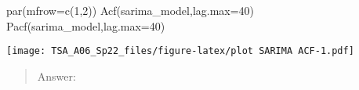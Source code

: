 \documentclass[
]{article}
\newenvironment{Shaded}{\begin{snugshade}}{\end{snugshade}}
\newcommand{\AttributeTok}[1]{\textcolor[rgb]{0.77,0.63,0.00}{#1}}
\newcommand{\DecValTok}[1]{\textcolor[rgb]{0.00,0.00,0.81}{#1}}
\newcommand{\FunctionTok}[1]{\textcolor[rgb]{0.00,0.00,0.00}{#1}}
\newcommand{\NormalTok}[1]{#1}
\begin{document}
\begin{Shaded}
\begin{Highlighting}[]
\FunctionTok{par}\NormalTok{(}\AttributeTok{mfrow=}\FunctionTok{c}\NormalTok{(}\DecValTok{1}\NormalTok{,}\DecValTok{2}\NormalTok{))}
\FunctionTok{Acf}\NormalTok{(sarima\_model,}\AttributeTok{lag.max=}\DecValTok{40}\NormalTok{)}
\FunctionTok{Pacf}\NormalTok{(sarima\_model,}\AttributeTok{lag.max=}\DecValTok{40}\NormalTok{)}
\end{Highlighting}
\end{Shaded}

\texttt{[image: TSA\_A06\_Sp22\_files/figure-latex/plot SARIMA ACF-1.pdf]}

\begin{quote}
Answer:
\end{quote}
\end{document}
